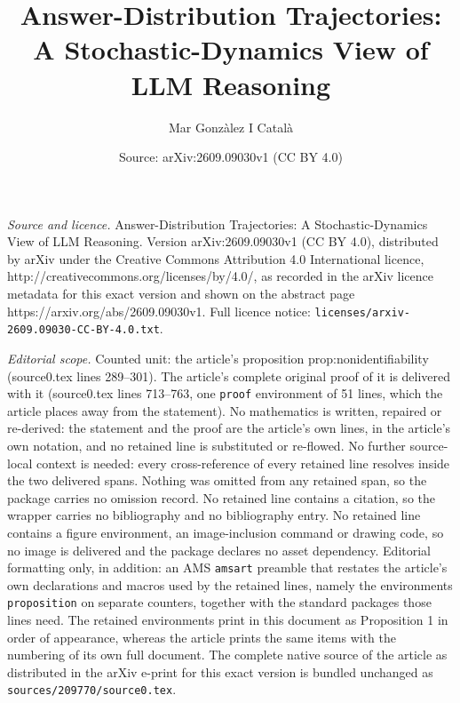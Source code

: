 \documentclass[10pt,a4paper]{amsart}
\title{Answer-Distribution Trajectories: A Stochastic-Dynamics View of LLM Reasoning}
\author{Mar Gonzàlez I Català}
\date{Source: arXiv:2609.09030v1 (CC BY 4.0)}
\begin{document}
\maketitle

\noindent\emph{Source and licence.} Answer-Distribution Trajectories: A Stochastic-Dynamics View of LLM Reasoning. Version arXiv:2609.09030v1 (CC BY 4.0), distributed by arXiv under the Creative Commons Attribution 4.0 International licence, http://creativecommons.org/licenses/by/4.0/, as recorded in the arXiv licence metadata for this exact version and shown on the abstract page https://arxiv.org/abs/2609.09030v1. Full licence notice: \texttt{licenses/arxiv-2609.09030-CC-BY-4.0.txt}.\par\smallskip

\noindent\textit{Editorial scope.} Counted unit: the article's proposition prop:nonidentifiability (source0.tex lines 289--301). The article's complete original proof of it is delivered with it (source0.tex lines 713--763, one \texttt{proof} environment of 51 lines, which the article places away from the statement). No mathematics is written, repaired or re-derived: the statement and the proof are the article's own lines, in the article's own notation, and no retained line is substituted or re-flowed.  No further source-local context is needed: every cross-reference of every retained line resolves inside the two delivered spans.  Nothing was omitted from any retained span, so the package carries no omission record.  No retained line contains a citation, so the wrapper carries no bibliography and no bibliography entry.  No retained line contains a figure environment, an image-inclusion command or drawing code, so no image is delivered and the package declares no asset dependency.  Editorial formatting only, in addition: an AMS \texttt{amsart} preamble that restates the article's own declarations and macros used by the retained lines, namely the environments \texttt{proposition} on separate counters, together with the standard packages those lines need.  The retained environments print in this document as Proposition 1 in order of appearance, whereas the article prints the same items with the numbering of its own full document.  The complete native source of the article as distributed in the arXiv e-print for this exact version is bundled unchanged as \texttt{sources/209770/source0.tex}.
\end{document}
